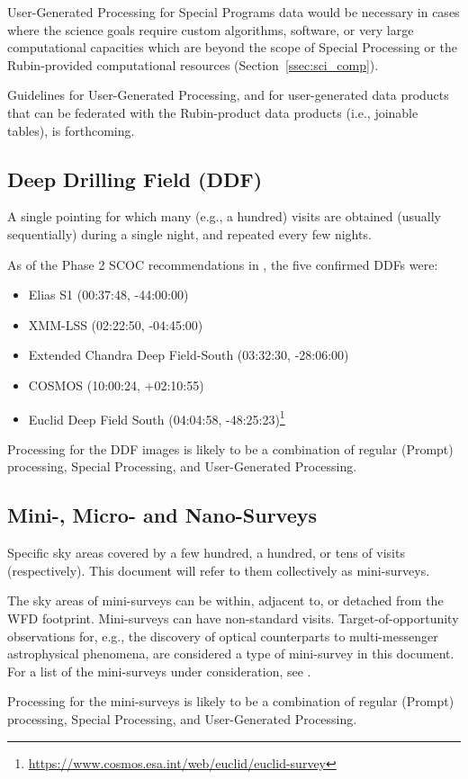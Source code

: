 User-Generated Processing for Special Programs data would be necessary in cases where
the science goals require custom algorithms, software, or very large computational
capacities which are beyond the scope of Special Processing or the Rubin-provided
computational resources (Section~\ref{ssec:sci_comp}).

Guidelines for User-Generated Processing, and for user-generated data products
that can be federated with the Rubin-product data products (i.e., joinable tables),
is forthcoming.

\subsection{Deep Drilling Field (DDF)}

A single pointing for which many (e.g., a hundred) visits are obtained 
(usually sequentially) during a single night, and repeated every few 
nights.

As of the Phase 2 SCOC recommendations in , the five 
confirmed DDFs were:

\begin{itemize}
\item Elias S1 (00:37:48, -44:00:00)
\item XMM-LSS (02:22:50, -04:45:00)
\item Extended Chandra Deep Field-South (03:32:30, -28:06:00)
\item COSMOS (10:00:24, +02:10:55)
\item Euclid Deep Field South  (04:04:58, -48:25:23)\footnote{\url{https://www.cosmos.esa.int/web/euclid/euclid-survey}}
\end{itemize}

Processing for the DDF images is likely to be a combination of regular (Prompt) processing,
Special Processing, and User-Generated Processing.

\subsection{Mini-, Micro- and Nano-Surveys}

Specific sky areas covered by a few hundred, a hundred, or tens of visits (respectively).
This document will refer to them collectively as mini-surveys.

The sky areas of mini-surveys can be within, adjacent to, or detached from the WFD footprint.
Mini-surveys can have non-standard visits.
Target-of-opportunity observations for, e.g., the discovery of optical counterparts to 
multi-messenger astrophysical phenomena, are considered a type of mini-survey in this document.
For a list of the mini-surveys under consideration,
see .

Processing for the mini-surveys is likely to be a combination of regular (Prompt) processing,
Special Processing, and User-Generated Processing.
